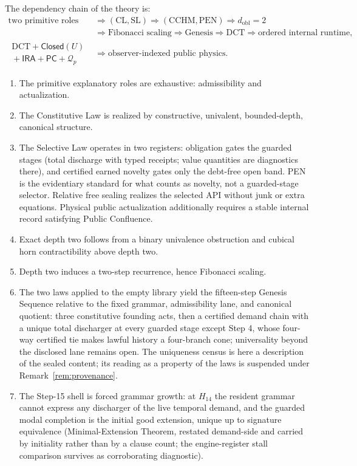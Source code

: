 \documentclass[11pt]{article}
\theoremstyle{plain}
\theoremstyle{definition}
\theoremstyle{remark}
\newcommand{\CL}{\mathrm{CL}}
\newcommand{\SLaw}{\mathrm{SL}}
\newcommand{\PEN}{\mathrm{PEN}}
\newcommand{\DCT}{\mathrm{DCT}}
\newcommand{\CCHM}{\mathrm{CCHM}}
\begin{document}
The dependency chain of the theory is:
\[
\begin{aligned}
\text{two primitive roles}
&\Rightarrow
(\CL,\SLaw)
\Rightarrow
(\CCHM,\PEN)
\Rightarrow
d_{\mathrm{obl}}=2
\\
&\Rightarrow
\text{Fibonacci scaling}
\Rightarrow
\text{Genesis}
\Rightarrow
\DCT
\Rightarrow
\text{ordered internal runtime},
\\
\substack{\DCT+\mathsf{Closed}(U)\\[-0.2em]{}+\mathsf{IRA}+\mathsf{PC}+\mathcal{Q}_p}
&\Rightarrow
\text{observer-indexed public physics}.
\end{aligned}
\]

\begin{enumerate}[leftmargin=*]
\item The primitive explanatory roles are exhaustive: admissibility and actualization.
\item The Constitutive Law is realized by constructive, univalent, bounded-depth, canonical structure.
\item The Selective Law operates in two registers: obligation gates the guarded stages (total discharge with typed receipts; value quantities are diagnostics there), and certified earned novelty gates only the debt-free open band. PEN is the evidentiary standard for what counts as novelty, not a guarded-stage selector. Relative free sealing realizes the selected API without junk or extra equations. Physical public actualization additionally requires a stable internal record satisfying Public Confluence.
\item Exact depth two follows from a binary univalence obstruction and cubical horn contractibility above depth two.
\item Depth two induces a two-step recurrence, hence Fibonacci scaling.
\item The two laws applied to the empty library yield the fifteen-step Genesis Sequence relative to the fixed grammar, admissibility lane, and canonical quotient: three constitutive founding acts, then a certified demand chain with a unique total discharger at every guarded stage except Step 4, whose four-way certified tie makes lawful history a four-branch cone; universality beyond the disclosed lane remains open. The uniqueness census is here a description of the sealed content; its reading as a property of the laws is suspended under Remark~\ref{rem:provenance}.
\item The Step-15 shell is forced grammar growth: at \(H_{14}\) the resident grammar cannot express any discharger of the live temporal demand, and the guarded modal completion is the initial good extension, unique up to signature equivalence (Minimal-Extension Theorem, restated demand-side and carried by initiality rather than by a clause count; the engine-register stall comparison survives as corroborating diagnostic).

\end{enumerate}
\end{document}
